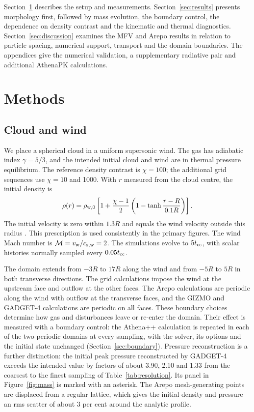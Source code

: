 \documentclass[twocolumn,apj,numberedappendix]{openjournal}
\begin{document}
Section~\ref{sec:methods} describes the setup and measurements. Section~\ref{sec:results} presents morphology first, followed by mass evolution, the boundary control, the dependence on density contrast and the kinematic and thermal diagnostics. Section~\ref{sec:discussion} examines the MFV and Arepo results in relation to particle spacing, numerical support, transport and the domain boundaries. The appendices give the numerical validation, a supplementary radiative pair and additional AthenaPK calculations.

\section{Methods}\label{sec:methods}
\subsection{Cloud and wind}
We place a spherical cloud in a uniform supersonic wind. The gas has adiabatic index $\gamma=5/3$, and the intended initial cloud and wind are in thermal pressure equilibrium. The reference density contrast is $\chi=100$; the additional grid sequences use $\chi=10$ and 1000. With $r$ measured from the cloud centre, the initial density is
\begin{equation}
\rho(r)=\rho_{\rm w,0}\left[1+\frac{\chi-1}{2}\left(1-\tanh\frac{r-R}{0.1R}\right)\right].
\label{eq:profile}
\end{equation}
The initial velocity is zero within $1.3R$ and equals the wind velocity outside this radius \citep[see also the initial velocity setup in][]{Gronnow2018}. This prescription is used consistently in the primary figures. The wind Mach number is $\mathcal M=v_{\rm w}/c_{\rm s,w}=2$. The simulations evolve to $5t_{\rm cc}$, with scalar histories normally sampled every $0.05t_{\rm cc}$.

The domain extends from $-3R$ to $17R$ along the wind and from $-5R$ to $5R$ in both transverse directions. The grid calculations impose the wind at the upstream face and outflow at the other faces. The Arepo calculations are periodic along the wind with outflow at the transverse faces, and the GIZMO and GADGET-4 calculations are periodic on all faces. These boundary choices determine how gas and disturbances leave or re-enter the domain. Their effect is measured with a boundary control: the Athena++ \citep{Stone2020} calculation is repeated in each of the two periodic domains at every sampling, with the solver, its options and the initial state unchanged (Section~\ref{sec:boundary}). Pressure reconstruction is a further distinction: the initial peak pressure reconstructed by GADGET-4 exceeds the intended value by factors of about 3.90, 2.10 and 1.33 from the coarsest to the finest sampling of Table~\ref{tab:resolution}. Its panel in Figure~\ref{fig:mass} is marked with an asterisk. The Arepo mesh-generating points are displaced from a regular lattice, which gives the initial density and pressure an rms scatter of about 3 per cent around the analytic profile.
\end{document}
